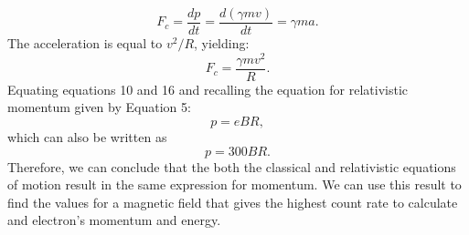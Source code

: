 \begin {equation} F_c=\frac{dp}{dt}=\frac{d(\gamma mv)}{dt}=\gamma ma. \end{equation}The acceleration is equal to $v^2/R$, yielding:
\begin{equation}F_c=\frac{\gamma mv^2}{R}.\end{equation} Equating equations 10 and 16 and  recalling the equation for relativistic momentum given by Equation 5:
\begin{equation}p=eBR,\end{equation} which can also be written as \begin{equation} p=300BR.\end{equation} Therefore, we can conclude that the both the classical and relativistic equations of motion result in the same expression for momentum. We can use this result to find the values for a magnetic field that gives the highest count rate to calculate and electron's momentum and energy. 

